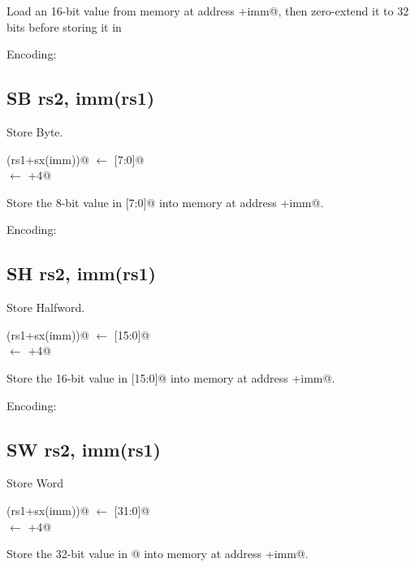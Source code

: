 Load an 16-bit value from memory at address +imm@, then 
zero-extend it to 32 bits before storing it in \verb@rd@

Encoding:


\subsection{SB rs2, imm(rs1)}

Store Byte.

(rs1+sx(imm))@ $\leftarrow$ [7:0]@\\
\verb@pc@ $\leftarrow$ \verb@pc+4@

Store the 8-bit value in [7:0]@ into memory at 
address +imm@.

Encoding:


\subsection{SH rs2, imm(rs1)}

Store Halfword.

(rs1+sx(imm))@ $\leftarrow$ [15:0]@\\
\verb@pc@ $\leftarrow$ \verb@pc+4@

Store the 16-bit value in [15:0]@ into memory at 
address +imm@.


Encoding:


\subsection{SW rs2, imm(rs1)}

Store Word

(rs1+sx(imm))@ $\leftarrow$ [31:0]@\\
\verb@pc@ $\leftarrow$ \verb@pc+4@

Store the 32-bit value in @ into memory at address +imm@.

